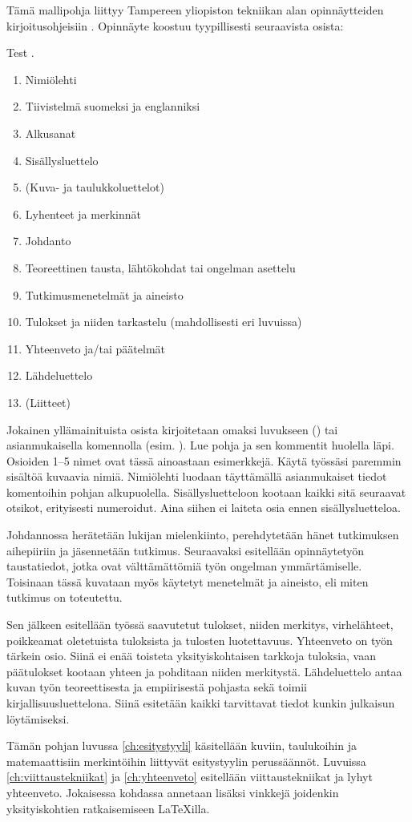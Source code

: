 Tämä mallipohja liittyy Tampereen yliopiston tekniikan alan opinnäytteiden kirjoitusohjeisiin . Opinnäyte koostuu tyypillisesti seuraavista osista:

Test \parencite{AnsibleDocs,alma9911217298805973,KiefMorris2020IaC2,RahmanAkond2021SSiA,JamesFreeman2020HEAo,GauravAgarwal2021MDP,JamesFreeman2020PA2}.

\begin{enumerate}
    \item[] Nimiölehti
    \item[] Tiivistelmä suomeksi ja englanniksi
    \item[] Alkusanat
    \item[] Sisällysluettelo
    \item[] (Kuva- ja taulukkoluettelot)
    \item[] Lyhenteet ja merkinnät
    \item Johdanto
    \item Teoreettinen tausta, lähtökohdat tai ongelman asettelu
    \item Tutkimusmenetelmät ja aineisto
    \item Tulokset ja niiden tarkastelu (mahdollisesti eri luvuissa)
    \item Yhteenveto ja/tai päätelmät
    \item[] Lähdeluettelo
    \item[] (Liitteet)
\end{enumerate}

Jokainen yllämainituista osista kirjoitetaan omaksi luvukseen () tai asianmukaisella komennolla (esim. ). Lue pohja ja sen kommentit huolella läpi. Osioiden 1--5 nimet ovat tässä ainoastaan esimerkkejä. Käytä työssäsi paremmin sisältöä kuvaavia nimiä. Nimiölehti luodaan täyttämällä asianmukaiset tiedot komentoihin pohjan alkupuolella. Sisällysluetteloon kootaan kaikki sitä seuraavat otsikot, erityisesti numeroidut. Aina siihen ei laiteta osia ennen sisällysluetteloa.

Johdannossa herätetään lukijan mielenkiinto, perehdytetään hänet tutkimuksen aihepiiriin ja jäsennetään tutkimus. Seuraavaksi esitellään opinnäytetyön taustatiedot, jotka ovat välttämättömiä työn ongelman ymmärtämiselle. Toisinaan tässä kuvataan myös käytetyt menetelmät ja aineisto, eli miten tutkimus on toteutettu.

Sen jälkeen esitellään työssä saavutetut tulokset, niiden merkitys, virhelähteet, poikkeamat oletetuista tuloksista ja tulosten luotettavuus. Yhteenveto on työn tärkein osio. Siinä ei enää toisteta yksityiskohtaisen tarkkoja tuloksia, vaan päätulokset kootaan yhteen ja pohditaan niiden merkitystä. Lähdeluettelo antaa kuvan työn teoreettisesta ja empiirisestä pohjasta sekä toimii kirjallisuusluettelona. Siinä esitetään kaikki tarvittavat tiedot kunkin julkaisun löytämiseksi.

Tämän pohjan luvussa \ref{ch:esitystyyli} käsitellään kuviin, taulukoihin ja matemaattisiin merkintöihin liittyvät esitystyylin perussäännöt. Luvuissa \ref{ch:viittaustekniikat} ja \ref{ch:yhteenveto} esitellään viittaustekniikat ja lyhyt yhteenveto. Jokaisessa kohdassa annetaan lisäksi vinkkejä joidenkin yksityiskohtien ratkaisemiseen \LaTeX{}illa.